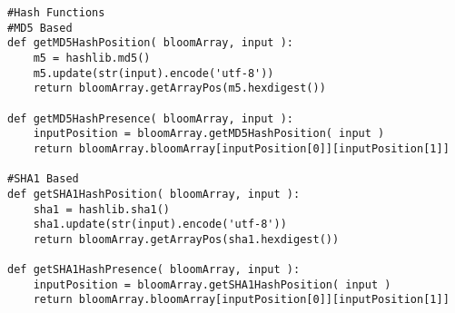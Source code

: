 \begin{lstlisting}
#Hash Functions
#MD5 Based
def getMD5HashPosition( bloomArray, input ):
	m5 = hashlib.md5()
	m5.update(str(input).encode('utf-8'))
	return bloomArray.getArrayPos(m5.hexdigest())

def getMD5HashPresence( bloomArray, input ):
	inputPosition = bloomArray.getMD5HashPosition( input )
	return bloomArray.bloomArray[inputPosition[0]][inputPosition[1]]

#SHA1 Based
def getSHA1HashPosition( bloomArray, input ):
	sha1 = hashlib.sha1()
	sha1.update(str(input).encode('utf-8'))
	return bloomArray.getArrayPos(sha1.hexdigest())

def getSHA1HashPresence( bloomArray, input ):
	inputPosition = bloomArray.getSHA1HashPosition( input )
	return bloomArray.bloomArray[inputPosition[0]][inputPosition[1]]
\end{lstlisting}